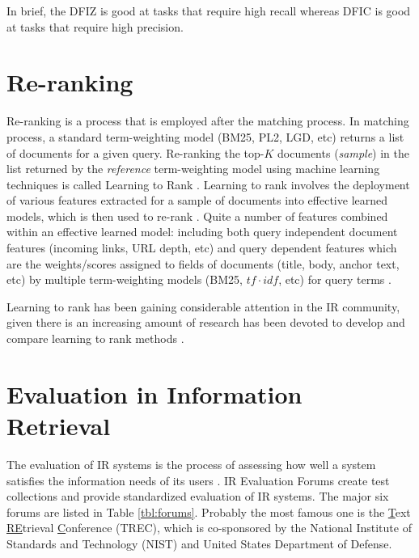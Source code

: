 In brief, the DFIZ is good at tasks that require high recall whereas DFIC is good at tasks that require high precision.

\section{Re-ranking}

Re-ranking is a process that is employed after the matching process.
In matching process, a standard term-weighting model (BM25, PL2, LGD, etc) returns a list of documents for a given query.
Re-ranking the top-$K$ documents (\emph{sample}) in the list returned by the \emph{reference} term-weighting model using machine learning techniques is called Learning to Rank \citep{LTR}.
Learning to rank involves the deployment of various features extracted for a sample of documents into effective learned models, which is then used to re-rank \citep{WhensHows}.
Quite a number of features combined within an effective learned model: including both query independent document features (incoming links, URL depth, etc) and query dependent features which are the weights/scores assigned to fields of documents (title, body, anchor text, etc) by multiple term-weighting models (BM25, $tf\cdot idf$, etc) for query terms \citep{MulFeatures}.

Learning to rank has been gaining considerable attention in the IR community, given there is an increasing amount of research has been devoted to develop and compare learning to rank methods \citep{87LTR}.

\section{Evaluation in Information Retrieval}
The evaluation of IR systems is the process of assessing how well a system satisfies the information needs of its users \citep{VoorheesIREval}.
IR Evaluation Forums create test collections and provide standardized evaluation of IR systems.
The major six forums are listed in Table \ref{tbl:forums}.
Probably the most famous one is the \underline{T}ext \underline{R}\underline{E}trieval \underline{C}onference (TREC), which is co-sponsored by the National Institute of Standards and Technology (NIST) and United States Department of Defense.

